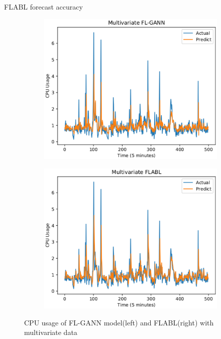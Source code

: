 \documentclass{beamer}
\begin{document}
\begin{frame}{FLABL forecast accuracy}
	\begin{figure}
		\centering
		\begin{subfigure}{0.5\textwidth}
			\centering
			\includegraphics[width=1.0\linewidth]{true/multi_cpu_flgann.eps}
			\label{fig:sub11}
		\end{subfigure}%
		\begin{subfigure}{.5\textwidth}
			\centering
			\includegraphics[width=1.0\linewidth]{true/multi_cpu_flabl.eps}
			\label{fig:sub21}
		\end{subfigure}%
		\caption{CPU usage of FL-GANN model(left) and FLABL(right) with multivariate data}
		\label{fig:cpu_predict}
	\end{figure}
\end{frame}
\end{document}
